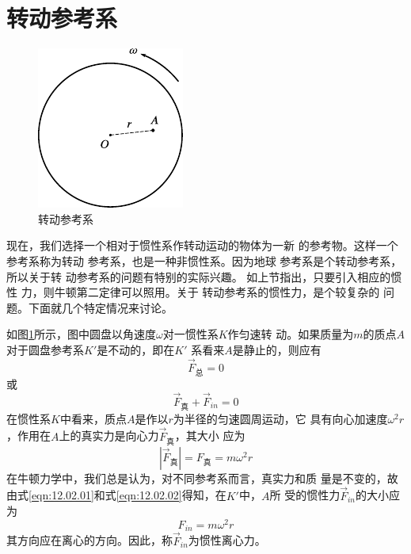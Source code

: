 \section{转动参考系}\label{sec:12.02}

\begin{figure}
    \vspace{-4em}
    \centering
    \includegraphics{figure/fig12.03}
    \caption{转动参考系}
    \label{fig:12.03}
\end{figure}
现在，我们选择一个相对于惯性系作转动运动的物体为一新
的参考物。这样一个参考系称为转动
参考系，也是一种非惯性系。因为地球
参考系是个转动参考系，所以关于转
动参考系的问题有特别的实际兴趣。
如上节指出，只要引入相应的惯性
力，则牛顿第二定律可以照用。关于
转动参考系的惯性力，是个较复杂的
问题。下面就几个特定情况来讨论。

如图\ref{fig:12.03}所示，图中圆盘以角速度$ \omega $对一惯性系$ K $作匀速转
动。如果质量为$ m $的质点$ A $对于圆盘参考系$ K' $是不动的，即在$ K' $
系看来$ A $是静止的，则应有
\begin{equation*}
    \vec{F} _ \text{总} = 0
\end{equation*}
或\vspace{-1.8em}
\begin{equation}\label{eqn:12.02.01}
    \vec{F} _ \text{真} + \vec{F} _ {in} = 0
\end{equation}
在惯性系$ K $中看来，质点$ A $是作以$ r $为半径的匀速圆周运动，它
具有向心加速度$ \omega ^ 2 r $，作用在$ A $上的真实力是向心力$ \vec{F} _ \text{真} $，其大小
应为\vspace{-1.7em}
\begin{equation}\label{eqn:12.02.02}
    | \vec{F} _ \text{真} | = F _ \text{真} = m \omega ^ { 2 } r
\end{equation}
在牛顿力学中，我们总是认为，对不同参考系而言，真实力和质
量是不变的，故由式\eqref{eqn:12.02.01}和式\eqref{eqn:12.02.02}得知，在$ K' $中，$ A $所
受的惯性力$ \vec{F} _ {in} $的大小应为
\begin{equation}\label{eqn:12.02.03}
    F _ { in } = m \omega ^ { 2 } r
\end{equation}
其方向应在离心的方向。因此，称$ \vec{F} _ {in} $为惯性离心力。


